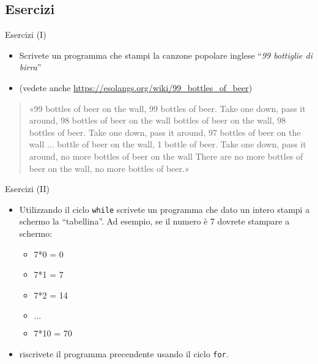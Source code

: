 \subsection[Esercizi]{Esercizi}

\begin{frame}{Esercizi (I)}
  \begin{itemize}
   \item Scrivete un programma che stampi la canzone popolare inglese ``\emph{99 bottiglie di birra}''
   \item (vedete anche \url{https://esolangs.org/wiki/99_bottles_of_beer})
  \end{itemize}
  \begin{quote}
   «99 bottles of beer on the wall, 99 bottles of beer.\newline
   Take one down, pass it around, 98 bottles of beer on the wall  bottles of beer on the wall, 98 bottles of beer.\newline
   Take one down, pass it around, 97 bottles of beer on the wall  \newline
   ... bottle of beer on the wall, 1 bottle of beer.\newline
   Take one down, pass it around, no more bottles of beer on the wall\newline
   There are no more bottles of beer on the wall, no more bottles of beer.»
  \end{quote}

\end{frame}

\begin{frame}{Esercizi (II)}
  \begin{itemize}
    \item Utilizzando il ciclo \texttt{while} scrivete un programma che dato un 
    intero stampi a schermo la ``tabellina''.
    Ad esempio, se il numero è 7 dovrete stampare a schermo:
    \begin{itemize}
      \item 7*0 = 0
      \item 7*1 = 7
      \item 7*2 = 14
      \item $\dots$
      \item 7*10 = 70
    \end{itemize}
    \item riscrivete il programma precendente usando il ciclo \texttt{for}.
  \end{itemize}
\end{frame}


